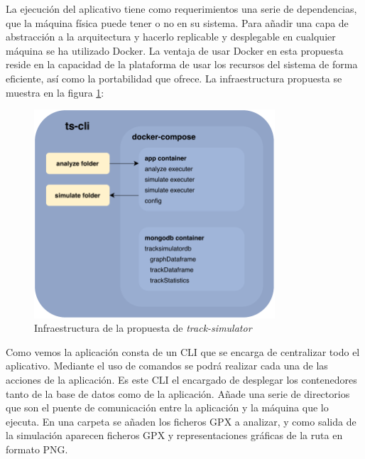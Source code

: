 La ejecución del aplicativo tiene como requerimientos una serie de dependencias, que 
la máquina física puede tener o no en su sistema. Para añadir una capa de abstracción 
a la arquitectura y hacerlo replicable y desplegable en cualquier máquina
se ha utilizado Docker. La ventaja de usar Docker en esta propuesta reside en la 
capacidad de la plataforma de usar los recursos del sistema de forma eficiente, así 
como la portabilidad que ofrece. La infraestructura propuesta se muestra en la figura 
\ref{figure:DockerStructure}:
\begin{figure}[htb]
\begin{center}
\includegraphics[width=0.8\textwidth]{./Imagenes/DockerStructure}
\caption{Infraestructura de la propuesta de \textit{track-simulator}}
\label{figure:DockerStructure}
\end{center}
\end{figure}
\newpage

Como vemos la aplicación consta de un \ac{CLI} que se encarga de centralizar todo 
el aplicativo. Mediante el uso de comandos se podrá realizar cada una de las acciones 
de la aplicación. Es este \ac{CLI} el encargado de desplegar los contenedores tanto de 
la base de datos como de la aplicación. Añade una serie de directorios que son el 
puente de comunicación entre la aplicación y la máquina que lo ejecuta. En una carpeta 
se añaden los ficheros \ac{GPX} a analizar, y como salida de la simulación aparecen 
ficheros \ac{GPX} y representaciones gráficas de la ruta en formato \ac{PNG}.
